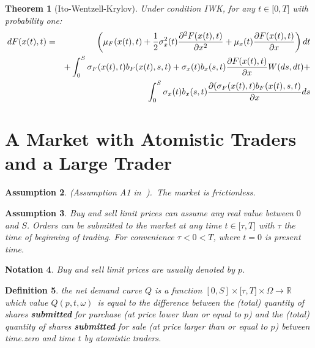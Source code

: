 \documentclass{article}
\newtheorem{theorem}{Theorem}[section]
\newtheorem{definition}[theorem]{Definition}
\newtheorem{assumption}[theorem]{Assumption}
\newtheorem{notation}[theorem]{Notation}
\begin{document}

\begin{theorem}[Ito-Wentzell-Krylov]
Under condition IWK, for any $t\in \lbrack 0,T]$ with probability one:%
\begin{eqnarray}
dF(x(t),t) &=&\left( \mu _{F}(x(t),t)+\frac{1}{2}\sigma _{x}^{2}(t)\frac{%
\partial ^{2}F(x(t),t)}{\partial x^{2}}+\mu _{x}(t)\frac{\partial F(x(t),t)}{%
\partial x}\right) dt  \label{ItoWentzell} \\
&&+\int_{0}^{S}\sigma _{F}(x(t),t)b_{F}(x(t),s,t)+\sigma _{x}(t)b_{x}(s,t)%
\frac{\partial F(x(t),t)}{\partial x}W(ds,dt)+  \notag \\
&&\int_{0}^{S}\sigma _{x}(t)b_{x}(s,t)\frac{\partial (\sigma
_{F}(x(t),t)b_{F}(x(t),s,t)}{\partial x}ds  \notag
\end{eqnarray}
\end{theorem}


\section{A Market with Atomistic Traders and a Large Trader}

\begin{assumption}\label{ass::market_frictionless}
(Assumption A1 in\textbf{\ }\cite{Jar92}).\ The market is frictionless.
\end{assumption}


\begin{assumption}
Buy and sell limit prices can assume any real value
between $0$ and $S$. Orders can be submitted to the market at any time $t\in
\mathbb{[\tau },T]$ with $\tau $ the time of beginning of trading. For
convenience $\tau <0<T$, where $t=0$ is present time.
\end{assumption}


\begin{notation}
Buy and sell limit prices are usually denoted by $p$.
\end{notation}



\begin{definition}
the net demand curve $Q$ is a function $[0,S]\times
\mathbb{[\tau },T]\times \Omega \mathbb{\rightarrow R}$ which value $%
Q(p,t,\omega )$\ is equal to the difference between the (total) quantity of
shares \textbf{submitted} for purchase (at price lower than or equal to $p$)
and the (total) quantity of shares \textbf{submitted} for sale (at price
larger than or equal to $p$) between time.zero and time $t$ by atomistic
traders.
\end{definition}
\end{document}
